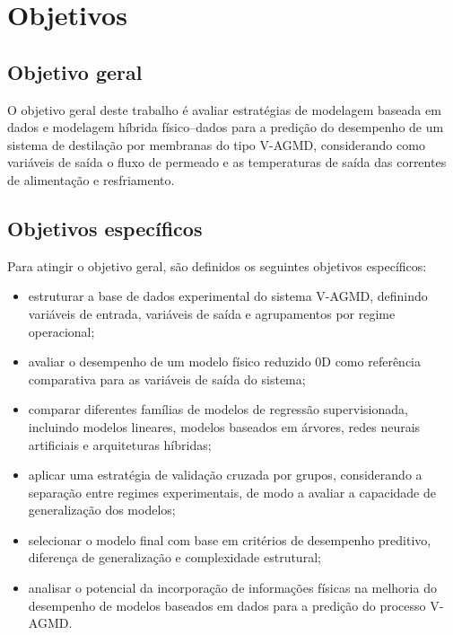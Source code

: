 \section{Objetivos}

\subsection{Objetivo geral}

O objetivo geral deste trabalho é avaliar estratégias de modelagem baseada em dados e modelagem híbrida físico--dados para a predição do desempenho de um sistema de destilação por membranas do tipo V-AGMD, considerando como variáveis de saída o fluxo de permeado e as temperaturas de saída das correntes de alimentação e resfriamento.

\subsection{Objetivos específicos}

Para atingir o objetivo geral, são definidos os seguintes objetivos específicos:

\begin{itemize}
    \item estruturar a base de dados experimental do sistema V-AGMD, definindo variáveis de entrada, variáveis de saída e agrupamentos por regime operacional;

    \item avaliar o desempenho de um modelo físico reduzido 0D como referência comparativa para as variáveis de saída do sistema;

    \item comparar diferentes famílias de modelos de regressão supervisionada, incluindo modelos lineares, modelos baseados em árvores, redes neurais artificiais e arquiteturas híbridas;

    \item aplicar uma estratégia de validação cruzada por grupos, considerando a separação entre regimes experimentais, de modo a avaliar a capacidade de generalização dos modelos;

    \item selecionar o modelo final com base em critérios de desempenho preditivo, diferença de generalização e complexidade estrutural;

    \item analisar o potencial da incorporação de informações físicas na melhoria do desempenho de modelos baseados em dados para a predição do processo V-AGMD.
\end{itemize}

